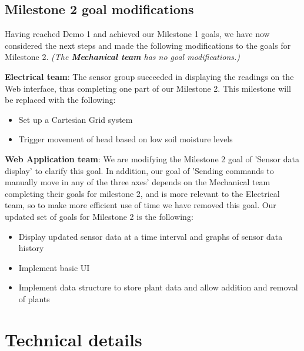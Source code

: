 \documentclass{article}
\begin{document}
\subsection{Milestone 2 goal modifications}
Having reached Demo 1 and achieved our Milestone 1 goals, we have now considered the next steps and made the following modifications to the goals for Milestone 2. 
\textit{(The \textbf{Mechanical team} has no goal modifications.)}

\textbf{Electrical team}: The sensor group succeeded in displaying the readings on the Web interface, thus completing one part of our Milestone 2. This milestone will be replaced with the following:
\begin{itemize}
    \vspace{-2mm}
    \setlength{\itemsep}{0pt}%
    \setlength{\parskip}{0pt}
    \item Set up a Cartesian Grid system
    \item Trigger movement of head based on low soil moisture levels
\end{itemize}

\textbf{Web Application team}:
We are modifying the Milestone 2 goal of 'Sensor data display' to clarify this goal. In addition, our goal of 'Sending commands to manually move in any of the three axes' depends on the Mechanical team completing their goals for milestone 2, and is more relevant to the Electrical team, so to make more efficient use of time we have removed this goal. Our updated set of goals for Milestone 2 is the following:
\begin{itemize}
    \setlength{\itemsep}{2pt}
    \setlength{\parskip}{0pt}
    \setlength{\topsep}{0pt}
    \item Display updated sensor data at a time interval and graphs of sensor data history
    \item Implement basic UI
    \item Implement data structure to store plant data and allow addition and removal of plants
\end{itemize}



\section{Technical details}
\end{document}
